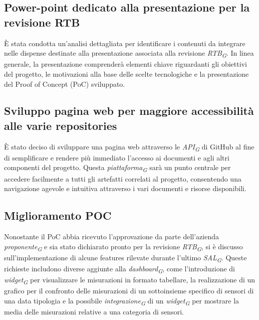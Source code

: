 \documentclass{article}
\begin{document}
    \subsection{Power-point dedicato alla presentazione per la revisione RTB}
    È stata condotta un'analisi dettagliata per identificare i contenuti da integrare nelle dispense destinate alla presentazione associata alla revisione \textit{RTB}\textsubscript{\textit{G}}. In linea generale, la presentazione comprenderà elementi chiave riguardanti gli obiettivi del progetto, le motivazioni alla base delle scelte tecnologiche e la presentazione del Proof of Concept (PoC) sviluppato.

    \subsection{Sviluppo pagina web per maggiore accessibilità alle varie repositories}
    È stato deciso di sviluppare una pagina web attraverso le \textit{API}\textsubscript{\textit{G}} di GitHub al fine di semplificare e rendere più immediato l'accesso ai documenti e agli altri componenti del progetto. Questa \textit{piattaforma}\textsubscript{\textit{G}} sarà un punto centrale per accedere facilmente a tutti gli artefatti correlati al progetto, consentendo una navigazione agevole e intuitiva attraverso i vari documenti e risorse disponibili.

    \subsection{Miglioramento POC}
    Nonostante il PoC abbia ricevuto l'approvazione da parte dell’azienda \textit{proponente}\textsubscript{\textit{G}} e sia stato dichiarato pronto per la revisione \textit{RTB}\textsubscript{\textit{G}}, si è discusso sull'implementazione di alcune features rilevate durante l'ultimo \textit{SAL}\textsubscript{\textit{G}}. Queste richieste includono diverse aggiunte alla \textit{dashboard}\textsubscript{\textit{G}}, come l'introduzione di \textit{widget}\textsubscript{\textit{G}} per visualizzare le misurazioni in formato tabellare, la realizzazione di un grafico per il confronto delle misurazioni di un sottoinsieme specifico di sensori di una data tipologia e la possibile \textit{integrazione}\textsubscript{\textit{G}} di un \textit{widget}\textsubscript{\textit{G}} per mostrare la media delle misurazioni relative a una categoria di sensori.
\end{document}
